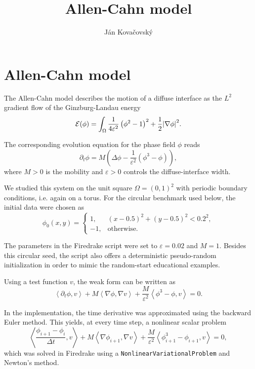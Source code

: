 \documentclass{article} %
\title{Allen-Cahn model}
\author{Ján Kovačovský}
\begin{document}
\section*{Allen-Cahn model}

The Allen-Cahn model describes the motion of a diffuse interface as the $L^2$ gradient flow of the Ginzburg-Landau energy \cite{AllenCahn1979}
\begin{equation}
    \mathcal{E}(\phi) = \int_{\Omega} \frac{1}{4 \varepsilon^2}\left(\phi^2 - 1\right)^2 + \frac{1}{2}\abs{\nabla \phi}^2.
\end{equation}

The corresponding evolution equation for the phase field $\phi$ reads
\begin{equation}
    \partial_t \phi = M \left(\Delta \phi - \frac{1}{\varepsilon^2}\left(\phi^3 - \phi\right)\right),
\end{equation}
where $M > 0$ is the mobility and $\varepsilon > 0$ controls the diffuse-interface width.

We studied this system on the unit square $\Omega = (0, 1)^2$ with periodic boundary conditions, i.e. again on a torus. For the circular benchmark used below, the initial data were chosen as
\begin{equation}
    \phi_0(x, y) =
    \begin{cases}
        1, & (x - 0.5)^2 + (y - 0.5)^2 < 0.2^2, \\
        -1, & \text{otherwise.}
    \end{cases}
\end{equation}

The parameters in the Firedrake script were set to $\varepsilon = 0.02$ and $M = 1$. Besides this circular seed, the script also offers a deterministic pseudo-random initialization in order to mimic the random-start educational examples.

Using a test function $v$, the weak form can be written as
\begin{equation}
    \left\langle \partial_t \phi, v \right\rangle + M\left\langle \nabla \phi, \nabla v \right\rangle + \frac{M}{\varepsilon^2}\left\langle \phi^3 - \phi, v \right\rangle = 0.
\end{equation}

In the implementation, the time derivative was approximated using the backward Euler method. This yields, at every time step, a nonlinear scalar problem
\begin{equation}
    \left\langle \frac{\phi_{i+1} - \phi_i}{\Delta t}, v \right\rangle + M\left\langle \nabla \phi_{i+1}, \nabla v \right\rangle + \frac{M}{\varepsilon^2}\left\langle \phi_{i+1}^3 - \phi_{i+1}, v \right\rangle = 0,
\end{equation}
which was solved in Firedrake using a \texttt{NonlinearVariationalProblem} and Newton's method.
\end{document}
